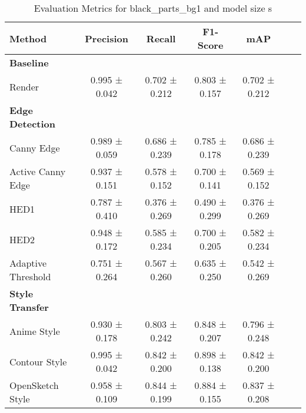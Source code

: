 \begin{table}[H]
    \scriptsize
    \caption{Evaluation Metrics for black_parts_bg1 and model size s}
    \begin{tabular}{lcccccc}
        \toprule
        \textbf{Method} & \textbf{Precision} & \textbf{Recall} & \textbf{F1-Score} & \textbf{mAP} \\
        \midrule
        \textbf{Baseline} & & & & \\
        Render & 0.995 ± 0.042 & 0.702 ± 0.212 & 0.803 ± 0.157 & 0.702 ± 0.212 \\
        \midrule
        \textbf{Edge Detection} & & & & \\
        Canny Edge & 0.989 ± 0.059 & 0.686 ± 0.239 & 0.785 ± 0.178 & 0.686 ± 0.239 \\
        Active Canny Edge & 0.937 ± 0.151 & 0.578 ± 0.152 & 0.700 ± 0.141 & 0.569 ± 0.152 \\
        HED1 & 0.787 ± 0.410 & 0.376 ± 0.269 & 0.490 ± 0.299 & 0.376 ± 0.269 \\
        HED2 & 0.948 ± 0.172 & 0.585 ± 0.234 & 0.700 ± 0.205 & 0.582 ± 0.234 \\
        Adaptive Threshold & 0.751 ± 0.264 & 0.567 ± 0.260 & 0.635 ± 0.250 & 0.542 ± 0.269 \\
        \midrule
        \textbf{Style Transfer} & & & & \\
        Anime Style & 0.930 ± 0.178 & 0.803 ± 0.242 & 0.848 ± 0.207 & 0.796 ± 0.248 \\
        Contour Style & 0.995 ± 0.042 & 0.842 ± 0.200 & 0.898 ± 0.138 & 0.842 ± 0.200 \\
        OpenSketch Style & 0.958 ± 0.109 & 0.844 ± 0.199 & 0.884 ± 0.155 & 0.837 ± 0.208 \\
        \bottomrule
    \end{tabular}
\end{table}
